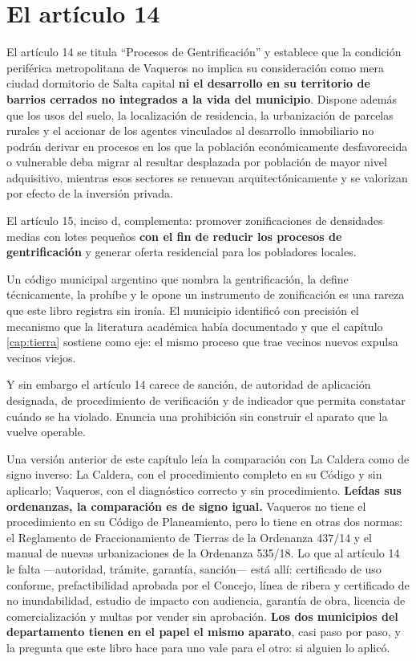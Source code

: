 \section{El artículo 14}

El artículo 14 se titula ``Procesos de Gentrificación'' y establece que la condición periférica metropolitana de Vaqueros no implica su consideración como mera ciudad dormitorio de Salta capital \textbf{ni el desarrollo en su territorio de barrios cerrados no integrados a la vida del municipio}. Dispone además que los usos del suelo, la localización de residencia, la urbanización de parcelas rurales y el accionar de los agentes vinculados al desarrollo inmobiliario no podrán derivar en procesos en los que la población económicamente desfavorecida o vulnerable deba migrar al resultar desplazada por población de mayor nivel adquisitivo, mientras esos sectores se renuevan arquitectónicamente y se valorizan por efecto de la inversión privada.

El artículo 15, inciso d, complementa: promover zonificaciones de densidades medias con lotes pequeños \textbf{con el fin de reducir los procesos de gentrificación} y generar oferta residencial para los pobladores locales.

Un código municipal argentino que nombra la gentrificación, la define técnicamente, la prohíbe y le opone un instrumento de zonificación es una rareza que este libro registra sin ironía. El municipio identificó con precisión el mecanismo que la literatura académica había documentado y que el capítulo \ref{cap:tierra} sostiene como eje: el mismo proceso que trae vecinos nuevos expulsa vecinos viejos.

Y sin embargo el artículo 14 carece de sanción, de autoridad de aplicación designada, de procedimiento de verificación y de indicador que permita constatar cuándo se ha violado. Enuncia una prohibición sin construir el aparato que la vuelve operable.

Una versión anterior de este capítulo leía la comparación con La Caldera como de signo inverso: La Caldera, con el procedimiento completo en su Código y sin aplicarlo; Vaqueros, con el diagnóstico correcto y sin procedimiento. \textbf{Leídas sus ordenanzas, la comparación es de signo igual.} Vaqueros no tiene el procedimiento en su Código de Planeamiento, pero lo tiene en otras dos normas: el Reglamento de Fraccionamiento de Tierras de la Ordenanza 437/14 y el manual de nuevas urbanizaciones de la Ordenanza 535/18. Lo que al artículo 14 le falta ---autoridad, trámite, garantía, sanción--- está allí: certificado de uso conforme, prefactibilidad aprobada por el Concejo, línea de ribera y certificado de no inundabilidad, estudio de impacto con audiencia, garantía de obra, licencia de comercialización y multas por vender sin aprobación. \textbf{Los dos municipios del departamento tienen en el papel el mismo aparato}, casi paso por paso, y la pregunta que este libro hace para uno vale para el otro: si alguien lo aplicó.

